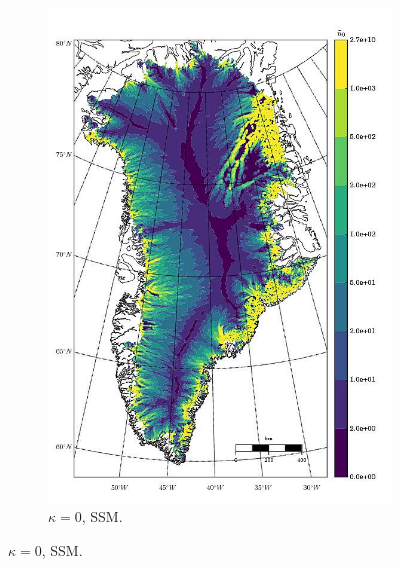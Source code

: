 \begin{figure}
\begin{subfigure}[b]{0.25\linewidth}
    \includegraphics[width=\linewidth]{images/balance_velocity/greenland/Ubar_5H_kappa_0_SSM.jpg}
  \caption{$\kappa = 0$, SSM.}
  \label{greenland_bv_image_kappa_5_SSM}
  \end{subfigure}


\end{figure}
